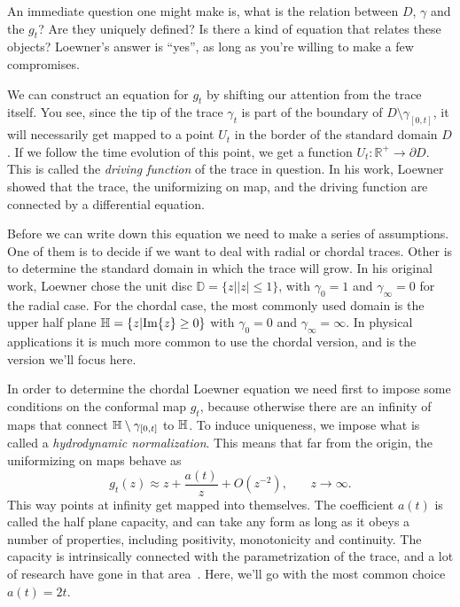 An immediate question one might make is, what is the relation between $D$,
$\gamma$ and the $g_t$? Are they uniquely defined? Is there a kind of equation
that relates these objects? Loewner's answer is ``yes'', as long as you're
willing to make a few compromises.

We can construct an equation for $g_t$ by shifting our attention from the trace
itself. You see, since the tip of the trace $\gamma_t$ is part of the boundary
of $D\setminus\gamma_{[0,t]}$, it will necessarily get mapped to a point $U_t$
in the border of the standard domain $D$. If we follow the time evolution of
this point, we get a function $U_t:\mathbb{R}^+\rightarrow\partial D$. This is
called the \textit{driving function} of the trace in question. In his work,
Loewner showed that the trace, the uniformizing on map, and the driving
function are connected by a differential equation.

Before we can write down this equation we need to make a series of assumptions.
One of them is to decide if we want to deal with radial or chordal traces.
Other is to determine the standard domain in which the trace will grow. In his
original work, Loewner chose the unit disc $\mathbb{D}=\{z||z|\leq1\}$, with
$\gamma_0=1$ and $\gamma_\infty=0$ for the radial case. For the chordal case,
the most commonly used domain is the upper half plane
$\mathbb{H}=\{z|\mbox{Im}\{z\}\geq0\}$ with $\gamma_0=0$ and $\gamma_\infty=\infty$.
In physical applications it is much more common to use the chordal version, and
is the version we'll focus here.

In order to determine the chordal Loewner equation we need first to impose some
conditions on the conformal map $g_t$, because otherwise there are an infinity
of maps that connect $\mathbb{H}\setminus\gamma_{[0,t]}$ to $\mathbb{H}$. To induce
uniqueness, we impose what is called a \textit{hydrodynamic normalization}.
This means that far from the origin, the uniformizing on maps behave as
\begin{equation}
    \label{eq:hydro}
    g_{t}\left(z\right)\approx
    z+\frac{a\left(t\right)}{z}+O\left(z^{-2}\right)
    ,\,\,\,\,\,\,\,\,\,\,\,
    z\rightarrow\infty.
\end{equation}
This way points at infinity get mapped into themselves. The coefficient $a(t)$
is called the half plane capacity, and can take any form as long as it obeys a
number of properties, including positivity, monotonicity and continuity. The
capacity is intrinsically connected with the parametrization of the trace, and
a lot of research have gone in that area~\cite{Lawler2011}. Here, we'll go with
the most common choice $a(t)=2t$.

